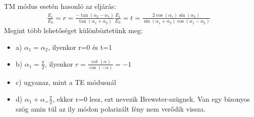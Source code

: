 \documentclass{article}
\begin{document}
TM módus esetén hasonló az eljárás:
\begin{gather*}
\frac{E_r}{E_0}=r =\frac{-\tan(\alpha_2-\alpha_1)}{\tan(\alpha_1 + \alpha_2)}
\frac{E_t}{E_0}=t=\frac{2\cos(\alpha_1)\sin(\alpha_2)}{\sin(\alpha_1 + \alpha_2)\cos(\alpha_1-\alpha_2)}
\end{gather*}
Megint több lehetőséget különböztetünk meg:
\begin{itemize}
\item a) $\alpha_1=\alpha_2$, ilyenkor r=0 és t=1
\item b) $\alpha_1 = \frac{\pi}{2}$, ilyenkor $r=\frac{\cot(\alpha)}{\cos(-\alpha)} = -1$
\item c) ugyanaz, mint a TE módusnál
\item d) $\alpha_1 + \alpha_ = \frac{\pi}{2}$, ekkor r=0 lesz, ezt nevezik Brewster-szügnek. Van egy bizonyos szög amin túl az ily módon polarizált fény nem verődik vissza. 
\end{itemize}
\end{document}
